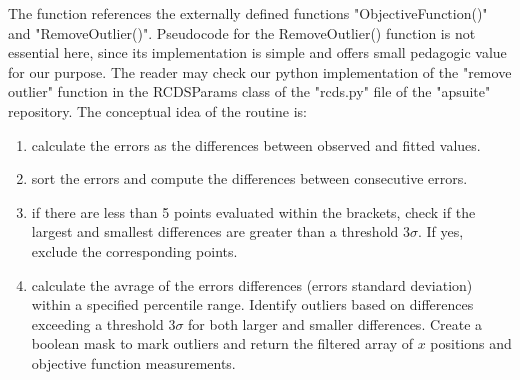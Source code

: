 The function references the externally defined functions "ObjectiveFunction()" and "RemoveOutlier()". Pseudocode for the RemoveOutlier() function is not essential here, since its implementation is simple and offers small pedagogic value for our purpose. The reader may check our python implementation of  the "remove outlier" function in the RCDSParams class of the "rcds.py" file of the "apsuite" repository. The conceptual idea of the routine is:
\begin{enumerate}
    \item calculate the errors as the differences between observed and fitted values.
    \item sort the errors and compute the differences between consecutive errors.
    \item if there are less than 5 points evaluated within the brackets, check if the largest and smallest differences are greater than a threshold $3\sigma$. If yes, exclude the corresponding points.
    \item calculate the avrage of the errors differences (errors standard deviation) within a specified percentile range. Identify outliers based on differences exceeding a threshold $3\sigma$ for both larger and smaller differences. Create a boolean mask to mark outliers and return the filtered array of $x$ positions and objective function measurements.
\end{enumerate}

